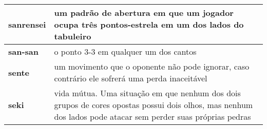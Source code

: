 \begin{longtable}{l|p{85mm}}
 \hline
 \textbf{sanrensei} & um padrão de abertura em que um jogador ocupa três pontos-estrela em um dos lados do tabuleiro \\
 \hline
 \textbf{san-san} & o ponto 3-3 em qualquer um dos cantos \\
 \hline
 \textbf{sente} & um movimento que o oponente não pode ignorar, caso contrário ele sofrerá uma perda inaceitável \\
 \hline
 \textbf{seki} & vida mútua. Uma situação em que nenhum dos dois grupos de cores opostas possui dois olhos, mas nenhum dos lados pode atacar sem perder suas próprias pedras \\
 \hline
\end{longtable}